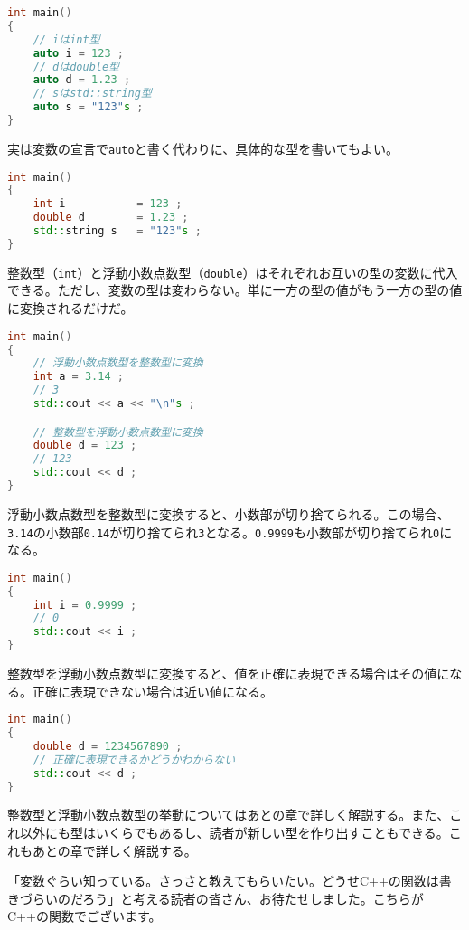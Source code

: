 \begin{lstlisting}[language={C++}]
int main()
{
    // iはint型
    auto i = 123 ;
    // dはdouble型
    auto d = 1.23 ;
    // sはstd::string型
    auto s = "123"s ;
}
\end{lstlisting}

実は変数の宣言で\texttt{auto}と書く代わりに、具体的な型を書いてもよい。

\begin{lstlisting}[language={C++}]
int main()
{
    int i           = 123 ;
    double d        = 1.23 ;
    std::string s   = "123"s ;
}
\end{lstlisting}

整数型（\texttt{int}）と浮動小数点数型（\texttt{double}）はそれぞれお互いの型の変数に代入できる。ただし、変数の型は変わらない。単に一方の型の値がもう一方の型の値に変換されるだけだ。

\begin{lstlisting}[language={C++}]
int main()
{
    // 浮動小数点数型を整数型に変換
    int a = 3.14 ;
    // 3
    std::cout << a << "\n"s ;

    // 整数型を浮動小数点数型に変換
    double d = 123 ;
    // 123
    std::cout << d ;
}
\end{lstlisting}

浮動小数点数型を整数型に変換すると、小数部が切り捨てられる。この場合、\texttt{3.14}の小数部\texttt{0.14}が切り捨てられ\texttt{3}となる。\texttt{0.9999}も小数部が切り捨てられ\texttt{0}になる。

\begin{lstlisting}[language={C++}]
int main()
{
    int i = 0.9999 ;
    // 0
    std::cout << i ;
}
\end{lstlisting}

整数型を浮動小数点数型に変換すると、値を正確に表現できる場合はその値になる。正確に表現できない場合は近い値になる。

\begin{lstlisting}[language={C++}]
int main()
{
    double d = 1234567890 ;
    // 正確に表現できるかどうかわからない
    std::cout << d ;
}
\end{lstlisting}

整数型と浮動小数点数型の挙動についてはあとの章で詳しく解説する。また、これ以外にも型はいくらでもあるし、読者が新しい型を作り出すこともできる。これもあとの章で詳しく解説する。


「変数ぐらい知っている。さっさと教えてもらいたい。どうせC++の関数は書きづらいのだろう」と考える読者の皆さん、お待たせしました。こちらがC++の関数でございます。

